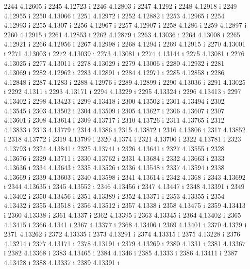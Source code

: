  2244  4.12605  i
 2245  4.12723  i
 2246  4.12803  i
 2247  4.1292  i
 2248  4.12918  i
 2249  4.12955  i
 2250  4.13066  i
 2251  4.12972  i
 2252  4.12882  i
 2253  4.12965  i
 2254  4.12993  i
 2255  4.1307  i
 2256  4.12967  i
 2257  4.12907  i
 2258  4.1286  i
 2259  4.12897  i
 2260  4.12915  i
 2261  4.12853  i
 2262  4.12879  i
 2263  4.13036  i
 2264  4.13008  i
 2265  4.12921  i
 2266  4.12956  i
 2267  4.12998  i
 2268  4.1294  i
 2269  4.12915  i
 2270  4.13001  i
 2271  4.13003  i
 2272  4.13039  i
 2273  4.13081  i
 2274  4.13144  i
 2275  4.13081  i
 2276  4.13025  i
 2277  4.13011  i
 2278  4.13029  i
 2279  4.13006  i
 2280  4.12932  i
 2281  4.13069  i
 2282  4.12962  i
 2283  4.12891  i
 2284  4.12971  i
 2285  4.12858  i
 2286  4.12848  i
 2287  4.1283  i
 2288  4.12976  i
 2289  4.12899  i
 2290  4.13036  i
 2291  4.13025  i
 2292  4.1311  i
 2293  4.13171  i
 2294  4.13229  i
 2295  4.13324  i
 2296  4.13413  i
 2297  4.13402  i
 2298  4.13423  i
 2299  4.13418  i
 2300  4.13502  i
 2301  4.13494  i
 2302  4.13545  i
 2303  4.13502  i
 2304  4.13509  i
 2305  4.13627  i
 2306  4.13607  i
 2307  4.13601  i
 2308  4.13614  i
 2309  4.13717  i
 2310  4.13726  i
 2311  4.13765  i
 2312  4.13833  i
 2313  4.13779  i
 2314  4.1386  i
 2315  4.13872  i
 2316  4.13806  i
 2317  4.13852  i
 2318  4.13772  i
 2319  4.13799  i
 2320  4.1374  i
 2321  4.13706  i
 2322  4.13781  i
 2323  4.13793  i
 2324  4.13841  i
 2325  4.13741  i
 2326  4.13641  i
 2327  4.13555  i
 2328  4.13676  i
 2329  4.13711  i
 2330  4.13762  i
 2331  4.13684  i
 2332  4.13663  i
 2333  4.13636  i
 2334  4.13643  i
 2335  4.13526  i
 2336  4.13548  i
 2337  4.13594  i
 2338  4.13669  i
 2339  4.13603  i
 2340  4.13598  i
 2341  4.13614  i
 2342  4.1368  i
 2343  4.13692  i
 2344  4.13635  i
 2345  4.13552  i
 2346  4.13456  i
 2347  4.13447  i
 2348  4.13391  i
 2349  4.13402  i
 2350  4.13456  i
 2351  4.13389  i
 2352  4.13371  i
 2353  4.13355  i
 2354  4.13432  i
 2355  4.13518  i
 2356  4.13512  i
 2357  4.1338  i
 2358  4.13475  i
 2359  4.13413  i
 2360  4.13338  i
 2361  4.1337  i
 2362  4.13395  i
 2363  4.13345  i
 2364  4.13402  i
 2365  4.13415  i
 2366  4.1341  i
 2367  4.13377  i
 2368  4.13406  i
 2369  4.13401  i
 2370  4.1329  i
 2371  4.13262  i
 2372  4.13335  i
 2373  4.13291  i
 2374  4.13315  i
 2375  4.13228  i
 2376  4.13214  i
 2377  4.13171  i
 2378  4.13191  i
 2379  4.13269  i
 2380  4.1331  i
 2381  4.13367  i
 2382  4.13368  i
 2383  4.13465  i
 2384  4.1346  i
 2385  4.1333  i
 2386  4.13411  i
 2387  4.13428  i
 2388  4.13337  i
 2389  4.13391  i
